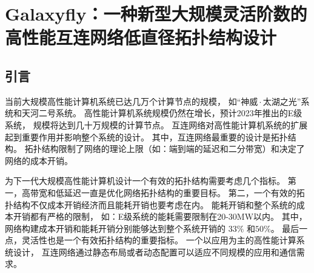 \chapter{Galaxyfly：一种新型大规模灵活阶数的高性能互连网络低直径拓扑结构设计}

\section{引言}
当前大规模高性能计算机系统已达几万个计算节点的规模，
如“$神威\cdot 太湖之光$”系统和天河二号系统。
高性能计算机系统规模仍然在增长，预计2023年推出的E级系统，
规模将达到几十万规模的计算节点。
互连网络对高性能计算机系统的扩展起到重要作用并影响整个系统的设计。
其中，互连网络最重要的设计是拓扑结构。
拓扑结构限制了网络的理论上限（如：端到端的延迟和二分带宽）和决定了网络的成本开销。

为下一代大规模高性能计算机设计一个有效的拓扑结构需要考虑几个指标。
第一，高带宽和低延迟一直是优化网络拓扑结构的重要目标。
第二，一个有效的拓扑结构不仅成本开销经济而且能耗开销也要考虑在内。
能耗开销和整个系统的成本开销都有严格的限制，
如：E级系统的能耗需要限制在20-30MW以内。
其中，网络构建成本开销和能耗开销分别能够达到整个系统开销的
$33\%$ 和$50\%$。
最后一点，灵活性也是一个有效拓扑结构的重要指标。
一个以应用为主的高性能计算系统设计，
互连网络通过静态布局或者动态配置可以适应不同规模的应用和通信需求。

